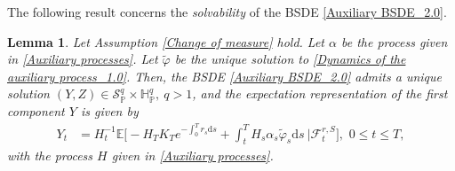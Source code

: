 \documentclass[12,reqno]{amsart}
\numberwithin{equation}{section}
\newtheorem{lemm}[defi]{Lemma}
\begin{document}
The following result concerns the \textit{solvability} of the BSDE \eqref{Auxiliary BSDE_2.0}.
\begin{lemm}\label{Solution to the auxiliary BSDE}
	Let Assumption \ref{Change of measure} hold. Let $\alpha$ be the process given in \eqref{Auxiliary processes}. Let $\widetilde{\varphi}$ be the unique solution to \eqref{Dynamics of the auxiliary process_1.0}. Then, the BSDE \eqref{Auxiliary BSDE_2.0}	admits a unique solution $(Y,Z)\in\mathcal{S}_{\mathbb{P}}^{q}\times\mathbb{H}_{\mathbb{P}}^{q},~q>1$, and the expectation representation of the first component $Y$ is given by
	\begin{align}
		Y_{t}&=H_{t}^{-1}\mathbb{E}\Big[-H_{T}K_{T}e^{-\int_{0}^{T}r_{s}\mathrm{d}s}+\int_{t}^{T}H_{s}\alpha_{s}\widetilde{\varphi}_{s}\mathrm{d}s~\big|\mathcal{F}_{t}^{r,S}\Big],\,\,0\le t\le T,
	\end{align}
	with the process $H$ given in \eqref{Auxiliary processes}.
\end{lemm}
\end{document}
